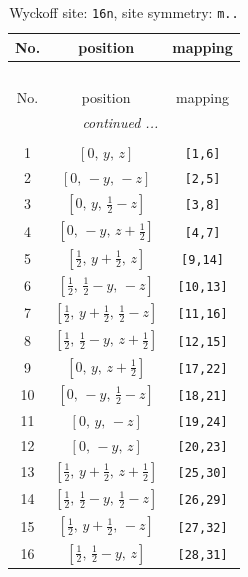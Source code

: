 \documentclass[fleqn,8pt]{jsarticle}
\begin{document}
\renewcommand{\arraystretch}{1.2}
\begin{longtable}{ccc}
\caption{Wyckoff site: {\tt 16n}, site symmetry: {\tt m..}}
 \\
 \hline \hline
No. & position & mapping \\ \hline \endfirsthead

\multicolumn{2}{l}{\tablename\ \thetable{}} \\
 \hline \hline
No. & position & mapping \\ \hline \endhead

 \hline \hline
\multicolumn{2}{r}{\footnotesize\it continued ...} \\ \endfoot

 \hline \hline
\multicolumn{2}{r}{} \\ \endlastfoot

1 & $\left[ 0,\, y,\, z \right]$ & {\tt [1,6]} \\ \hline
2 & $\left[ 0,\, - y,\, - z \right]$ & {\tt [2,5]} \\ \hline
3 & $\left[ 0,\, y,\, \frac{1}{2} - z \right]$ & {\tt [3,8]} \\ \hline
4 & $\left[ 0,\, - y,\, z + \frac{1}{2} \right]$ & {\tt [4,7]} \\ \hline
5 & $\left[ \frac{1}{2},\, y + \frac{1}{2},\, z \right]$ & {\tt [9,14]} \\ \hline
6 & $\left[ \frac{1}{2},\, \frac{1}{2} - y,\, - z \right]$ & {\tt [10,13]} \\ \hline
7 & $\left[ \frac{1}{2},\, y + \frac{1}{2},\, \frac{1}{2} - z \right]$ & {\tt [11,16]} \\ \hline
8 & $\left[ \frac{1}{2},\, \frac{1}{2} - y,\, z + \frac{1}{2} \right]$ & {\tt [12,15]} \\ \hline
9 & $\left[ 0,\, y,\, z + \frac{1}{2} \right]$ & {\tt [17,22]} \\ \hline
10 & $\left[ 0,\, - y,\, \frac{1}{2} - z \right]$ & {\tt [18,21]} \\ \hline
11 & $\left[ 0,\, y,\, - z \right]$ & {\tt [19,24]} \\ \hline
12 & $\left[ 0,\, - y,\, z \right]$ & {\tt [20,23]} \\ \hline
13 & $\left[ \frac{1}{2},\, y + \frac{1}{2},\, z + \frac{1}{2} \right]$ & {\tt [25,30]} \\ \hline
14 & $\left[ \frac{1}{2},\, \frac{1}{2} - y,\, \frac{1}{2} - z \right]$ & {\tt [26,29]} \\ \hline
15 & $\left[ \frac{1}{2},\, y + \frac{1}{2},\, - z \right]$ & {\tt [27,32]} \\ \hline
16 & $\left[ \frac{1}{2},\, \frac{1}{2} - y,\, z \right]$ & {\tt [28,31]} \\
\end{longtable}
\end{document}

